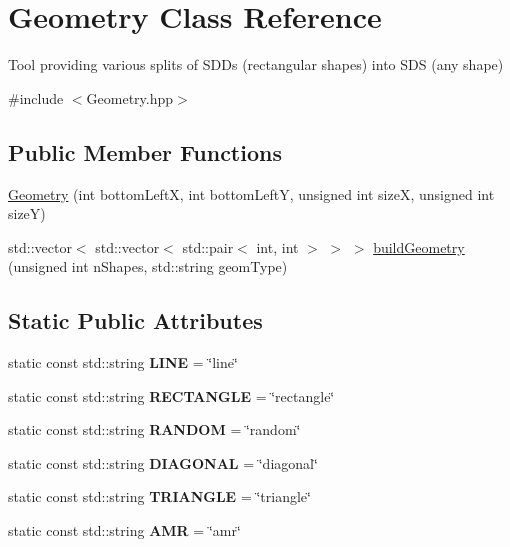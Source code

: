 \hypertarget{classGeometry}{}\section{Geometry Class Reference}
\label{classGeometry}


Tool providing various splits of S\+D\+Ds (rectangular shapes) into S\+DS (any shape)  




{\ttfamily \#include $<$Geometry.\+hpp$>$}

\subsection*{Public Member Functions}
\begin{DoxyCompactItemize}
\item 
\mbox{\hyperlink{classGeometry_ac7e6a2114a9969257aa18147575cd2fb}{Geometry}} (int bottom\+LeftX, int bottom\+LeftY, unsigned int sizeX, unsigned int sizeY)
\item 
std\+::vector$<$ std\+::vector$<$ std\+::pair$<$ int, int $>$ $>$ $>$ \mbox{\hyperlink{classGeometry_a64fa42fab5fe0c5e9bb7d960bafa55fd}{build\+Geometry}} (unsigned int n\+Shapes, std\+::string geom\+Type)
\end{DoxyCompactItemize}
\subsection*{Static Public Attributes}
\begin{DoxyCompactItemize}
\item 
\mbox{\label{classGeometry_a58cd0d80518f153a1e219140cb91980b}} 
static const std\+::string {\bfseries L\+I\+NE} = \char`\"{}line\char`\"{}
\item 
\mbox{\label{classGeometry_a914bf3bdc008a1651aa315c4dd47318d}} 
static const std\+::string {\bfseries R\+E\+C\+T\+A\+N\+G\+LE} = \char`\"{}rectangle\char`\"{}
\item 
\mbox{\label{classGeometry_a6ac0d43e3e3e040bb7b2d1aacd2c7491}} 
static const std\+::string {\bfseries R\+A\+N\+D\+OM} = \char`\"{}random\char`\"{}
\item 
\mbox{\label{classGeometry_a4a7f3e4300ea2d63741981a6265b75bd}} 
static const std\+::string {\bfseries D\+I\+A\+G\+O\+N\+AL} = \char`\"{}diagonal\char`\"{}
\item 
\mbox{\label{classGeometry_ac7c81afa8454187adc7be4e7b7f68d3c}} 
static const std\+::string {\bfseries T\+R\+I\+A\+N\+G\+LE} = \char`\"{}triangle\char`\"{}
\item 
\mbox{\label{classGeometry_ad93926a0e530cc7e85a79ebc9da99b32}} 
static const std\+::string {\bfseries A\+MR} = \char`\"{}amr\char`\"{}
\end{DoxyCompactItemize}


